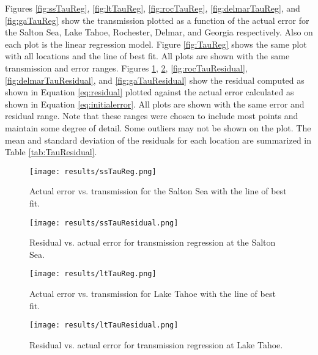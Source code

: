 \documentclass{book}
\begin{document}
Figures \ref{fig:ssTauReg}, \ref{fig:ltTauReg}, \ref{fig:rocTauReg}, \ref{fig:delmarTauReg}, and \ref{fig:gaTauReg} show the transmission plotted as a function of the actual error for the Salton Sea, Lake Tahoe, Rochester, Delmar, and Georgia respectively.  Also on each plot is the linear regression model.  Figure \ref{fig:TauReg} shows the same plot with all locations and the line of best fit.  All plots are shown with the same transmission and error ranges.  Figures \ref{fig:ssTauResidual}, \ref{fig:ltTauResidual}, \ref{fig:rocTauResidual}, \ref{fig:delmarTauResidual}, and \ref{fig:gaTauResidual} show the residual computed as shown in Equation \ref{eq:residual} plotted against the actual error calculated as shown in Equation \ref{eq:initialerror}.  All plots are shown with the same error and residual range.  Note that these ranges were chosen to include most points and maintain some degree of detail.  Some outliers may not be shown on the plot.  The mean and standard deviation of the residuals for each location are summarized in Table \ref{tab:TauResidual}.

\begin{figure}[H]
\begin{minipage}[b]{0.47\textwidth}
\centering
\texttt{[image: results/ssTauReg.png]}
\caption{Actual error vs. transmission for the Salton Sea with the line of best fit.}
\label{fig:ssTauReg}
\end{minipage}
\begin{minipage}[b]{0.47\textwidth}
\centering
\texttt{[image: results/ssTauResidual.png]}
\caption{Residual vs. actual error for transmission regression at the Salton Sea.}
\label{fig:ssTauResidual}
\end{minipage}
\end{figure}

\begin{figure}[H]
\begin{minipage}[b]{0.47\textwidth}
\centering
\texttt{[image: results/ltTauReg.png]}
\caption{Actual error vs. transmission for Lake Tahoe with the line of best fit.}
\label{fig:ltTauReg}
\end{minipage}
\begin{minipage}[b]{0.47\textwidth}
\centering
\texttt{[image: results/ltTauResidual.png]}
\caption{Residual vs. actual error for transmission regression at Lake Tahoe.}
\label{fig:ltTauResidual}
\end{minipage}
\end{figure}
\end{document}
